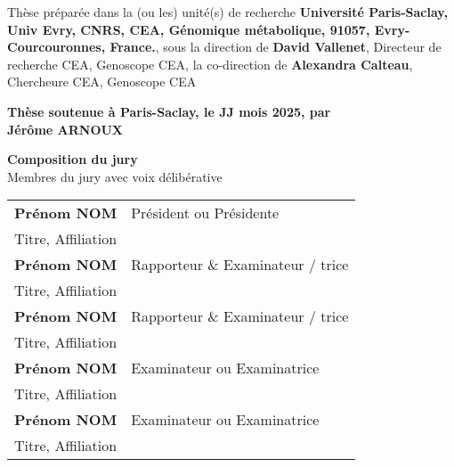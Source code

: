 \begin{titlepage}
\footnotesize Thèse préparée dans la (ou les) unité(s) de recherche \textbf{Université Paris-Saclay, Univ Evry, CNRS, CEA, Génomique métabolique, 91057, Evry-Courcouronnes, France.}, sous la direction de \textbf{David Vallenet}, Directeur de recherche CEA, Genoscope CEA, la co-direction de \textbf{Alexandra Calteau}, Chercheure CEA, Genoscope CEA\\
\vspace{15mm}

\textbf{Thèse soutenue à Paris-Saclay, le JJ mois 2025, par}\\
\bigskip
\Large {\color{Prune} \textbf{Jérôme ARNOUX}} %

\vspace{\fill} %

\bigskip

\flushleft
\small {\color{Prune} \textbf{Composition du jury}}\\
{\color{Prune} \scriptsize {Membres du jury avec voix délibérative}} \\
\vspace{2mm}
\scriptsize
\begin{tabular}{|p{7cm}l}
\arrayrulecolor{Prune}
\textbf{Prénom NOM} &   Président ou Présidente\\ 
Titre, Affiliation & \\
\textbf{Prénom NOM} &  Rapporteur \& Examinateur / trice \\ 
Titre, Affiliation   &   \\ 
\textbf{Prénom NOM} &  Rapporteur \& Examinateur / trice \\ 
Titre, Affiliation  &   \\ 
\textbf{Prénom NOM} &  Examinateur ou Examinatrice \\ 
Titre, Affiliation   &   \\ 
\textbf{Prénom NOM} &  Examinateur ou Examinatrice \\ 
Titre, Affiliation   &   \\ 
 

\end{tabular} 

\end{titlepage}